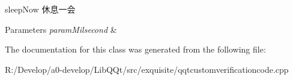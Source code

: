 sleep\+Now 休息一会 


\begin{DoxyParams}{Parameters}
{\em param\+Milsecond} & \\
\hline
\end{DoxyParams}


The documentation for this class was generated from the following file\+:\begin{DoxyCompactItemize}
\item 
R\+:/\+Develop/a0-\/develop/\+Lib\+Q\+Qt/src/exquisite/qqtcustomverificationcode.\+cpp\end{DoxyCompactItemize}
